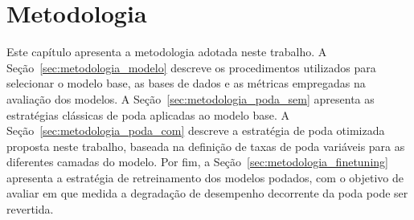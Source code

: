
\chapter{Metodologia}\label{chap:metodologia}

Este capítulo apresenta a metodologia adotada neste trabalho. A Seção~\ref{sec:metodologia_modelo} descreve os procedimentos utilizados para selecionar o modelo base, as bases de dados e as métricas empregadas na avaliação dos modelos. A Seção~\ref{sec:metodologia_poda_sem} apresenta as estratégias clássicas de poda aplicadas ao modelo base. A Seção~\ref{sec:metodologia_poda_com} descreve a estratégia de poda otimizada proposta neste trabalho, baseada na definição de taxas de poda variáveis para as diferentes camadas do modelo. Por fim, a Seção~\ref{sec:metodologia_finetuning} apresenta a estratégia de retreinamento dos modelos podados, com o objetivo de avaliar em que medida a degradação de desempenho decorrente da poda pode ser revertida.

